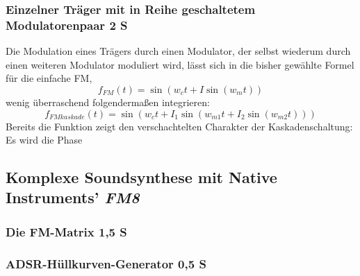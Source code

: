 \subsubsection{Einzelner Träger mit in Reihe geschaltetem Modulatorenpaar 2 S}

Die Modulation eines Trägers durch einen Modulator, der selbst wiederum durch einen weiteren Modulator moduliert wird, lässt sich in die bisher gewählte Formel für die einfache FM,
\begin{equation}
f_{FM}(t) = \sin(w_ct + I\sin(w_mt))
\end{equation}
wenig überraschend folgendermaßen integrieren:
\begin{equation}
f_{FMkaskade}(t) = \sin(w_ct + I_1\sin(w_{m1}t + I_2\sin(w_{m2}t)))
\end{equation}
Bereits die Funktion zeigt den verschachtelten Charakter der Kaskadenschaltung: Es wird die Phase 

\subsection{Komplexe Soundsynthese mit Native Instruments' \textit{FM8}}

\subsubsection{Die FM-Matrix 1,5 S}


\subsubsection{ADSR-Hüllkurven-Generator 0,5 S}
\